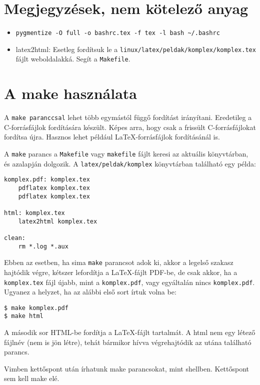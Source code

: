 \documentclass[a4paper]{article}
\begin{document}
\section{Megjegyzések, nem kötelező anyag}
\begin{itemize}
\item
\begin{Verbatim}
pygmentize -O full -o bashrc.tex -f tex -l bash ~/.bashrc
\end{Verbatim}

\item latex2html: Esetleg fordítsuk le a 
\verb!linux/latex/peldak/komplex/komplex.tex! fájlt weboldalakká. Segít
a \verb!Makefile!.
\end{itemize}

\section{A make használata}
A \texttt{make paranccsal} lehet több egymástól függő fordítást irányítani.
Eredetileg a C-forrásfájlok fordítására készült. Képes arra, hogy csak a
frissült C-forrásfájlokat fordítsa újra. Hasznos lehet
például \LaTeX-forrásfájlok fordításánál is.

A \texttt{make} parancs a \texttt{Makefile} vagy \texttt{makefile} fájlt
keresi az aktuális könyvtárban, és azalapján dolgozik.  A
\texttt{latex/peldak/komplex} könyvtárban található egy példa:
\begin{Verbatim}[label=\fbox{Makefile}, frame=single]
komplex.pdf: komplex.tex
	pdflatex komplex.tex
	pdflatex komplex.tex

html: komplex.tex
	latex2html komplex.tex

clean:
	rm *.log *.aux
\end{Verbatim}

Ebben az esetben, ha sima \texttt{make} parancsot adok ki, akkor a
legelső szakasz hajtódik végre, kétszer lefordítja a \LaTeX-fájlt
PDF-be, de csak akkor, ha a \texttt{komplex.tex} fájl újabb, mint a
\texttt{komplex.pdf},
vagy egyáltalán nincs \texttt{komplex.pdf}.
Ugyanez a helyzet, ha az alábbi első sort írtuk volna be:
\begin{Verbatim}
$ make komplex.pdf
$ make html
\end{Verbatim}
A második sor HTML-be fordítja a \LaTeX-fájlt tartalmát. A html nem egy
létező fájlnév (nem is jön létre), tehát bármikor hívva végrehajtódik az
utána található parancs.

Vimben kettőspont után írhatunk make parancsokat, mint shellben.
Kettőspont sem kell make elé.
\end{document}
